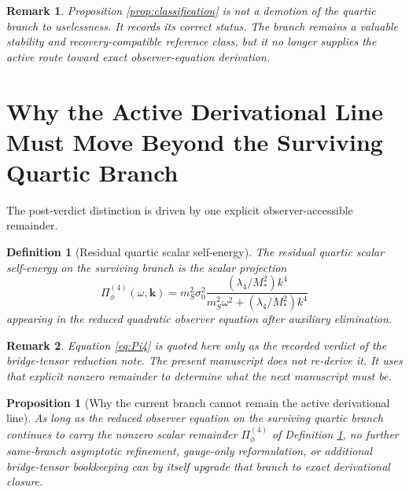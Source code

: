 \documentclass[11pt]{article}
\newtheorem{definition}{Definition}
\newtheorem{proposition}{Proposition}
\newtheorem{remark}{Remark}
\begin{document}
\begin{remark}
Proposition \ref{prop:classification} is not a demotion of the quartic branch to uselessness. It records its correct status. The branch remains a valuable stability and recovery-compatible reference class, but it no longer supplies the active route toward exact observer-equation derivation.
\end{remark}

\section{Why the Active Derivational Line Must Move Beyond the Surviving Quartic Branch}

The post-verdict distinction is driven by one explicit observer-accessible remainder.

\begin{definition}[Residual quartic scalar self-energy]
\label{def:Pi4}
The \emph{residual quartic scalar self-energy} on the surviving branch is the scalar projection
\begin{equation}
\Pi_\phi^{(4)}(\omega,\mathbf{k})
=
m_S^2\sigma_0^2
\frac{(\lambda_4/M_*^2)k^4}
{m_S^2\omega^2+(\lambda_4/M_*^2)k^4}
\label{eq:Pi4}
\end{equation}
appearing in the reduced quadratic observer equation after auxiliary elimination.
\end{definition}

\begin{remark}
Equation \eqref{eq:Pi4} is quoted here only as the recorded verdict of the bridge-tensor reduction note. The present manuscript does not re-derive it. It uses that explicit nonzero remainder to determine what the next manuscript must be.
\end{remark}

\begin{proposition}[Why the current branch cannot remain the active derivational line]
\label{prop:notsamebranch}
As long as the reduced observer equation on the surviving quartic branch continues to carry the nonzero scalar remainder \(\Pi_\phi^{(4)}\) of Definition \ref{def:Pi4}, no further same-branch asymptotic refinement, gauge-only reformulation, or additional bridge-tensor bookkeeping can by itself upgrade that branch to exact derivational closure.
\end{proposition}
\end{document}

